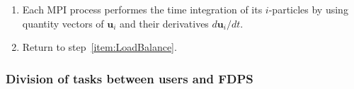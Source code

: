 \begin{enumerate}
\item Each MPI process performes the time integration of its $i$-particles
  by using quantity vectors of $\bm{u}_i$ and their
  derivatives $d\bm{u}_i/dt$.
  \label{item:IntegrateTime}

\item Return to step~\ref{item:LoadBalance}.
\end{enumerate}


\subsubsection{Division of tasks between users and FDPS}

